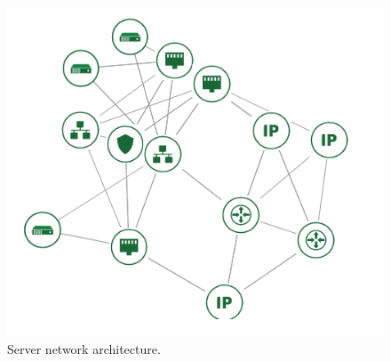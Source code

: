 \begin{figure}[H]
    \centering
    \includegraphics[width=\textwidth]{inc/images/DevOpsArchitecture.png}
    \caption{Server network architecture.}
    \label{fig:serverNet}
\end{figure}